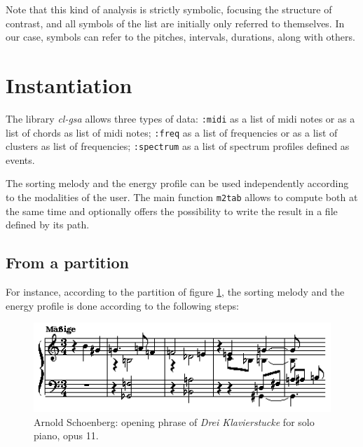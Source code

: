 \bigskip 

Note that this kind of analysis is strictly symbolic, focusing the structure of contrast, and all symbols of the list are initially only referred to themselves. In our case, symbols can refer to the pitches, intervals, durations, along with others.

\section{Instantiation}

The library \textsl{cl-gsa} allows three types of data: \texttt{:midi} as a list of midi notes or as a list of chords as list of midi notes; \texttt{:freq} as a list of frequencies or as a list of clusters as list of frequencies; \texttt{:spectrum} as a list of spectrum profiles defined as events.

The sorting melody and the energy profile can be used independently according to the modalities of the user. The main function \texttt{m2tab} allows to compute both at the same time and optionally offers the possibility to write the result in a file defined by its path.

\subsection{From a partition}

For instance, according to the partition of figure \ref{fig:op11}, the sorting melody and the energy profile is done according to the following steps:

\begin{figure}[!hbt]
	\begin{center}
		\includegraphics[scale=0.6]{img/2311}
		\caption{Arnold Schoenberg: opening phrase of \textit{Drei Klavierstucke} for solo piano, opus 11.}
		\label{fig:op11}
	\end{center}
\end{figure}

